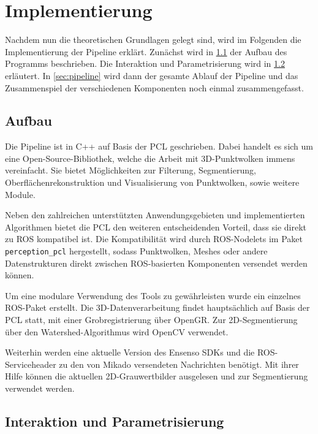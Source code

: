 
\chapter{Implementierung}
\label{ch:implementierung}

Nachdem nun die theoretischen Grundlagen gelegt sind, wird im Folgenden die Implementierung der Pipeline erklärt.
Zunächst wird in \ref{sec:aufbau} der Aufbau des Programms beschrieben.
Die Interaktion und Parametrisierung wird in \ref{sec:interaktion} erläutert.
In \ref{sec:pipeline} wird dann der gesamte Ablauf der Pipeline und das Zusammenspiel der verschiedenen Komponenten noch einmal zusammengefasst.



\section{Aufbau}
\label{sec:aufbau}

Die Pipeline ist in C++ auf Basis der \ac{PCL} \cite{rusu2011pcl} geschrieben.
Dabei handelt es sich um eine Open-Source-Bibliothek, welche die Arbeit mit 3D-Punktwolken immens vereinfacht.
Sie bietet Möglichkeiten zur Filterung, Segmentierung, Oberflächenrekonstruktion und Visualisierung von Punktwolken, sowie weitere Module.

Neben den zahlreichen unterstützten Anwendungsgebieten und implementierten Algorithmen bietet die \ac{PCL} den weiteren entscheidenden Vorteil, dass sie direkt zu \ac{ROS} kompatibel ist.
Die Kompatibilität wird durch ROS-Nodelets im Paket \texttt{perception\_pcl} hergestellt, sodass Punktwolken, Meshes oder andere Datenstrukturen direkt zwischen \ac{ROS}-basierten Komponenten versendet werden können.

Um eine modulare Verwendung des Tools zu gewährleisten wurde ein einzelnes \ac{ROS}-Paket erstellt.
Die 3D-Datenverarbeitung findet hauptsächlich auf Basis der \ac{PCL} statt, mit einer Grobregistrierung über \ac{OpenGR}.
Zur 2D-Segmentierung über den Watershed-Algorithmus wird OpenCV verwendet.

Weiterhin werden eine aktuelle Version des Ensenso SDKs und die \ac{ROS}-Serviceheader zu den von Mikado versendeten Nachrichten benötigt.
Mit ihrer Hilfe können die aktuellen 2D-Grauwertbilder ausgelesen und zur Segmentierung verwendet werden.



\section{Interaktion und Parametrisierung}
\label{sec:interaktion}

